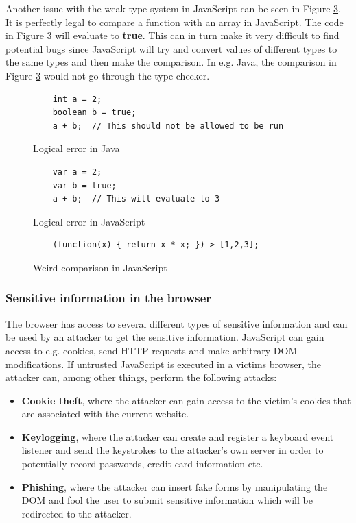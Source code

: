 Another issue with the weak type system in JavaScript can be seen in Figure \ref{fig:js_comparison}. It is perfectly legal to compare a function with an array in JavaScript. The code in Figure \ref{fig:js_comparison} will evaluate to \textbf{true}. This can in turn make it very difficult to find potential bugs since JavaScript will try and convert values of different types to the same types and then make the comparison. In e.g. Java, the comparison in Figure \ref{fig:js_comparison} would not go through the type checker.
\begin{figure}[h]
  \lstset{language=Java}
  \begin{lstlisting}
    int a = 2;
    boolean b = true;
    a + b;  // This should not be allowed to be run
  \end{lstlisting}
  \caption{Logical error in Java}
  \label{fig:error_java}
\end{figure}
\begin{figure}[h]
  \begin{lstlisting}
    var a = 2;
    var b = true;
    a + b;  // This will evaluate to 3
  \end{lstlisting}
  \caption{Logical error in JavaScript}
  \label{fig:error_js}
\end{figure}
\begin{figure}[h]
  \begin{lstlisting}
    (function(x) { return x * x; }) > [1,2,3];
  \end{lstlisting}
  \caption{Weird comparison in JavaScript}
  \label{fig:js_comparison}
\end{figure}

\subsubsection{Sensitive information in the browser}
The browser has access to several different types of sensitive information and can be used by an attacker to get the sensitive information. JavaScript can gain access to e.g. cookies, send HTTP requests and make arbitrary DOM modifications. If untrusted JavaScript is executed in a victims browser, the attacker can, among other things, perform the following attacks:
\begin{itemize}
  \item \textbf{Cookie theft}, where the attacker can gain access to the victim's cookies that are associated with the current website.
  \item \textbf{Keylogging}, where the attacker can create and register a keyboard event listener and send the keystrokes to the attacker's own server in order to potentially record passwords, credit card information etc.
  \item \textbf{Phishing}, where the attacker can insert fake forms by manipulating the DOM and fool the user to submit sensitive information which will be redirected to the attacker.
\end{itemize}
